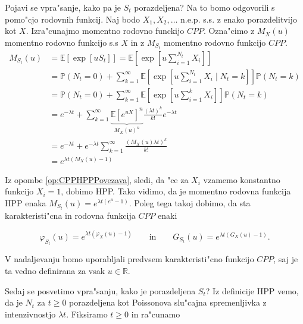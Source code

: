 \documentclass[12pt, a4paper, reqno]{amsart}
\theoremstyle{definition} %
\theoremstyle{plain} %
\newcommand{\R}{\mathbb{R}}
\newcommand{\E}{\mathbb{E}}
\newcommand{\Prob}{\mathbb{P}}
\newcommand{\1}{\mathds{1}}
\begin{document}
    \noindent
    Pojavi se vpra"sanje, kako pa je $S_t$ porazdeljena? Na to bomo odgovorili s pomo"cjo rodovnih
    funkcij. Naj bodo $X_1, X_2, \dots$ n.e.p. s.s.  z enako porazdelitvijo kot $X$.
    Izra"cunajmo momentno rodovno funckijo $CPP$. Ozna"cimo z $M_X(u)$ momentno rodovno funkcijo 
    s.s $X$ in z $M_{S_t}$ momentno rodovno funkcijo $CPP$.
    \begin{align*}
        M_{S_t}(u) 
                &= \E\left[\exp\left[uS_t\right]\right] =
                    \E\left[\exp\left[u\sum_{i = 1}^{N_t}X_i\right]\right]\\
                &= \Prob\left(N_t = 0\right) + \sum_{k=1}^{\infty}
                    \E\left[\exp\left[u\sum_{i = 1}^{N_t}X_i\mid N_t=k\right]\right]\Prob\left(N_t = k\right)\\ 
                &= \Prob\left(N_t = 0\right) + \sum_{k=1}^{\infty}
                    \E\left[\exp\left[u\sum_{i = 1}^kX_i\right]\right]\Prob\left(N_t = k\right)\\
                &= e^{-\lambda t} + \sum_{k=1}^{\infty}
                    \underbrace{\E\left[e^{uX}\right]^n}_{M_X(u)^n}\frac{(\lambda t)^k}{k!}e^{-\lambda t}\\ 
                &= e^{-\lambda t} + e^{-\lambda t}\sum_{k=1}^\infty\frac{\left(M_X(u)\lambda t\right)^k}{k!}\\
                &= e^{\lambda t\left(M_X(u) - 1\right)}    
    \end{align*}

    Iz opombe \ref{op:CPPHPPPovezava}, sledi, da "ce za $X_i$ vzamemo konstantno funkcijo 
    $X_i = 1$, dobimo HPP. Tako vidimo, da je momentno rodovna funkcija HPP enaka 
    $M_{S_t}(u) = e^{\lambda t\left(e^u - 1\right)}$. Poleg tega takoj dobimo, da sta 
    karakteristi"cna in rodovna funkcija $CPP$ enaki

    \begin{equation*}
        \varphi_{S_t}(u) = e^{\lambda t\left(\varphi_X(u) - 1\right)} \qquad \text{in} \qquad 
        G_{S_t}(u) = e^{\lambda t\left(G_X(u) - 1\right)}.
    \end{equation*} 

    \noindent
    V nadaljevanju bomo uporabljali predvsem karakteristi"cno funkcijo $CPP$, saj je ta vedno definirana 
    za vsak $u\in\R$.

    \noindent
    Sedaj se posvetimo vpra"sanju, kako je porazdeljena $S_t$? Iz definicije HPP vemo, da je 
    $N_t$ za $t\geq0$ porazdeljena kot Poissonova slu"cajna spremenljivka z intenzivnostjo 
    $\lambda t$. Fiksiramo $t\geq0$ in ra"cunamo
\end{document}
